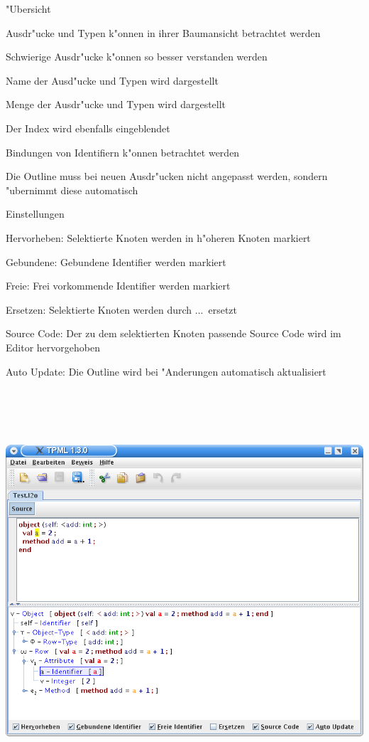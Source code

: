 {
  \begin{itemgroup}{"Ubersicht}
    \item Ausdr"ucke und Typen k"onnen in ihrer Baumansicht betrachtet werden
    \item Schwierige Ausdr"ucke k"onnen so besser verstanden werden
    \item Name der Ausd"ucke und Typen wird dargestellt
    \item Menge der Ausdr"ucke und Typen wird dargestellt
    \item Der Index wird ebenfalls eingeblendet
    \item Bindungen von Identifiern k"onnen betrachtet werden
    \item Die Outline muss bei neuen Ausdr"ucken nicht angepasst werden,
          sondern "ubernimmt diese automatisch
  \end{itemgroup}
}

{
  \begin{itemgroup}{Einstellungen}
    \item \glqq Hervorheben\grqq: Selektierte Knoten werden in h"oheren Knoten markiert
    \item \glqq Gebundene\grqq: Gebundene Identifier werden markiert
    \item \glqq Freie\grqq: Frei vorkommende Identifier werden markiert
    \item \glqq Ersetzen\grqq: Selektierte Knoten werden durch \glqq ...\grqq\ ersetzt
    \item \glqq Source Code\grqq: Der zu dem selektierten Knoten passende Source Code
                                  wird im Editor hervorgehoben
    \item \glqq Auto Update\grqq: Die Outline wird bei "Anderungen automatisch aktualisiert
  \end{itemgroup}
}

{
  \begin{center}
    \includegraphics[height=15cm]{images/outline.png}
  \end{center}
}